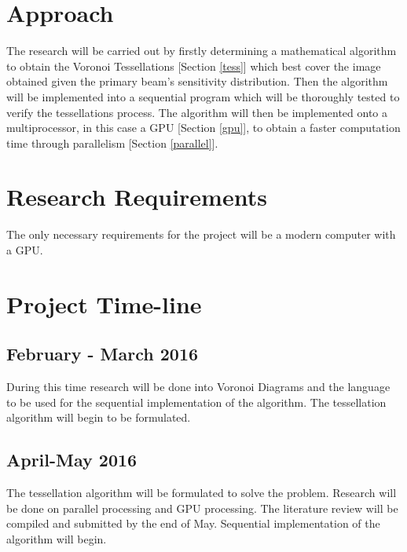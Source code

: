 \section{Approach}
The research will be carried out by firstly determining a mathematical algorithm to obtain the Voronoi Tessellations [Section \ref{tess}] which best cover the image obtained given the primary beam's sensitivity distribution. Then the algorithm will be implemented into a sequential program which will be thoroughly tested to verify the tessellations process. The algorithm will then be implemented onto a multiprocessor, in this case a GPU [Section \ref{gpu}], to obtain a faster computation time through parallelism [Section \ref{parallel}].
\section{Research Requirements}
The only necessary requirements for the project will be a modern computer with a GPU.
\section{Project Time-line}

\subsection{February - March 2016}
During this time research will be done into Voronoi Diagrams and the language to be used for the sequential implementation of the algorithm. The tessellation algorithm will begin to be formulated.

\subsection{April-May 2016}
The tessellation algorithm will be formulated to solve the problem. Research will be done on parallel processing and GPU processing. The literature review will be compiled and submitted by the end of May. Sequential implementation of the algorithm will begin.

